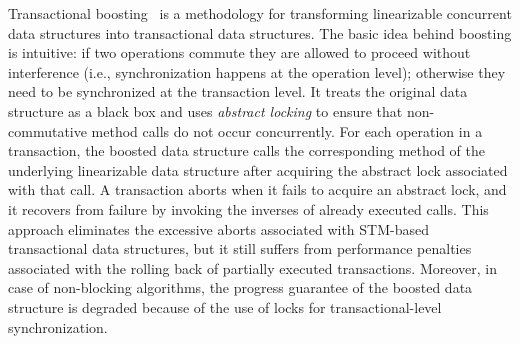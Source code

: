 \documentclass[10pt,conference,compsocconf]{IEEEtran}
\begin{document}
Transactional boosting~\cite{herlihy2008transactional} is a methodology for transforming linearizable concurrent data structures into transactional data structures.
The basic idea behind boosting is intuitive: if two operations commute they are allowed to proceed without interference (i.e., synchronization happens at the operation level); otherwise they need to be synchronized at the transaction level.
It treats the original data structure as a black box and uses \emph{abstract locking} to ensure that non-commutative method calls do not occur concurrently. 
For each operation in a transaction, the boosted data structure calls the corresponding method of the underlying linearizable data structure after acquiring the abstract lock associated with that call. 
A transaction aborts when it fails to acquire an abstract lock, and it recovers from failure by invoking the inverses of already executed calls. 
This approach eliminates the excessive aborts associated with STM-based transactional data structures, but it still suffers from performance penalties associated with the rolling back of partially executed transactions.
Moreover, in case of non-blocking algorithms, the progress guarantee of the boosted data structure is degraded because of the use of locks for transactional-level synchronization.
 
\end{document}
